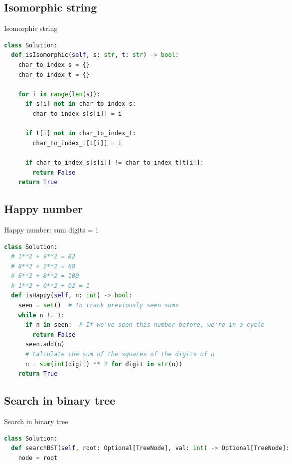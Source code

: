 \documentclass[a4paper,12pt]{article}
\begin{document}
\begin{multicols}{2}
\subsection{Isomorphic string}

\begin{mycode}[label={lst:isomorphic-string}]{Isomorphic string}
\begin{lstlisting}[language=Python]
class Solution:
  def isIsomorphic(self, s: str, t: str) -> bool:
    char_to_index_s = {}
    char_to_index_t = {}

    for i in range(len(s)):
      if s[i] not in char_to_index_s:
        char_to_index_s[s[i]] = i
      
      if t[i] not in char_to_index_t:
        char_to_index_t[t[i]] = i
      
      if char_to_index_s[s[i]] != char_to_index_t[t[i]]:
        return False
    return True
\end{lstlisting}
\end{mycode}

\subsection{Happy number}

\begin{mycode}[label={lst:is-happy-number}]{Happy number: sum digits = 1}
\begin{lstlisting}[language=Python]
class Solution:
  # 1**2 + 9**2 = 82
  # 8**2 + 2**2 = 68
  # 6**2 + 8**2 = 100
  # 1**2 + 0**2 + 02 = 1
  def isHappy(self, n: int) -> bool:
    seen = set()  # To track previously seen sums
    while n != 1:
      if n in seen:  # If we've seen this number before, we're in a cycle
        return False
      seen.add(n)
      # Calculate the sum of the squares of the digits of n
      n = sum(int(digit) ** 2 for digit in str(n))
    return True
\end{lstlisting}
\end{mycode}

\subsection{Search in binary tree}

\begin{mycode}[label={lst:search-binary-tree}]{Search in binary tree}
\begin{lstlisting}[language=Python]
class Solution:
  def searchBST(self, root: Optional[TreeNode], val: int) -> Optional[TreeNode]:
    node = root


\end{lstlisting}
\end{mycode}
\end{multicols}
\end{document}
